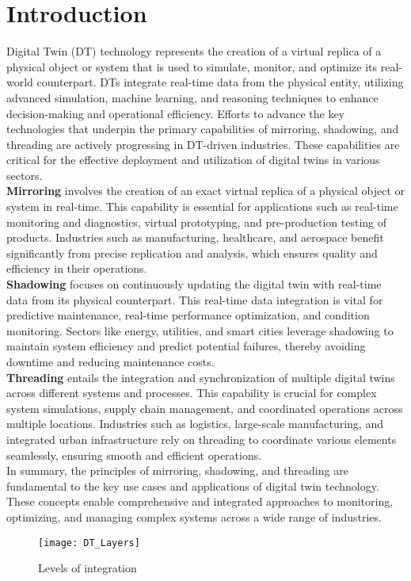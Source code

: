 \section{Introduction}

Digital Twin (DT) technology represents the creation of a virtual replica of a physical object or system that is used to simulate, monitor, and optimize its real-world counterpart. DTs integrate real-time data from the physical entity, utilizing advanced simulation, machine learning, and reasoning techniques to enhance decision-making and operational efficiency.\cite{jiang2021industrial}
Efforts to advance the key technologies that underpin the primary capabilities of mirroring, shadowing, and threading are actively progressing in DT-driven industries. These capabilities are critical for the effective deployment and utilization of digital twins in various sectors.\cite{jiang2021industrial}
\\ \textbf{Mirroring} involves the creation of an exact virtual replica of a physical object or system in real-time. This capability is essential for applications such as real-time monitoring and diagnostics, virtual prototyping, and pre-production testing of products. Industries such as manufacturing, healthcare, and aerospace benefit significantly from precise replication and analysis, which ensures quality and efficiency in their operations.\cite{jiang2021industrial}
\\ \textbf{Shadowing} focuses on continuously updating the digital twin with real-time data from its physical counterpart. This real-time data integration is vital for predictive maintenance, real-time performance optimization, and condition monitoring. Sectors like energy, utilities, and smart cities leverage shadowing to maintain system efficiency and predict potential failures, thereby avoiding downtime and reducing maintenance costs.\cite{jiang2021industrial}
\\ \textbf{Threading} entails the integration and synchronization of multiple digital twins across different systems and processes. This capability is crucial for complex system simulations, supply chain management, and coordinated operations across multiple locations. Industries such as logistics, large-scale manufacturing, and integrated urban infrastructure rely on threading to coordinate various elements seamlessly, ensuring smooth and efficient operations.\cite{jiang2021industrial}
\\ In summary, the principles of mirroring, shadowing, and threading are fundamental to the key use cases and applications of digital twin technology. These concepts enable comprehensive and integrated approaches to monitoring, optimizing, and managing complex systems across a wide range of industries.

\begin{figure}[h]
    \centering
    \texttt{[image: DT\_Layers]}
    \caption{Levels of integration}
    \label{fig:mesh1}
\end{figure}